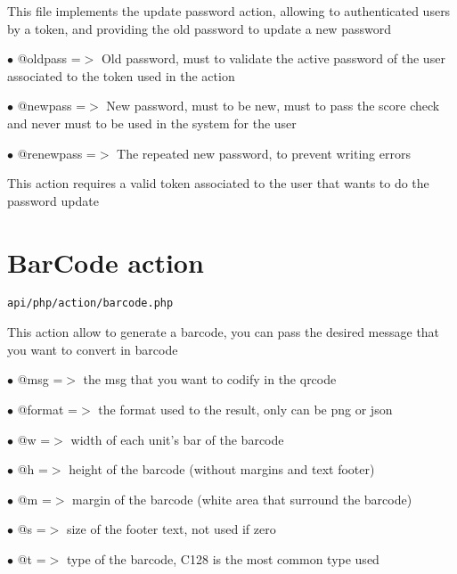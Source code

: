\documentclass[a4paper]{book}
\begin{document}
This file implements the update password action, allowing to authenticated
users by a token, and providing the old password to update a new password

\begin{compactitem}
\item[\color{myblue}$\bullet$] @oldpass   =$>$ Old password, must to validate the active password of the user
              associated to the token used in the action
\item[\color{myblue}$\bullet$] @newpass   =$>$ New password, must to be new, must to pass the score check and
              never must to be used in the system for the user
\item[\color{myblue}$\bullet$] @renewpass =$>$ The repeated new password, to prevent writing errors
\end{compactitem}

This action requires a valid token associated to the user that wants to do
the password update

\hypertarget{toc8}{}
\section{BarCode action}

\begin{lstlisting}
api/php/action/barcode.php
\end{lstlisting}

This action allow to generate a barcode, you can pass the desired
message that you want to convert in barcode

\begin{compactitem}
\item[\color{myblue}$\bullet$] @msg    =$>$ the msg that you want to codify in the qrcode
\item[\color{myblue}$\bullet$] @format =$>$ the format used to the result, only can be png or json
\end{compactitem}

\begin{compactitem}
\item[\color{myblue}$\bullet$] @w =$>$ width of each unit's bar of the barcode
\item[\color{myblue}$\bullet$] @h =$>$ height of the barcode (without margins and text footer)
\item[\color{myblue}$\bullet$] @m =$>$ margin of the barcode (white area that surround the barcode)
\item[\color{myblue}$\bullet$] @s =$>$ size of the footer text, not used if zero
\item[\color{myblue}$\bullet$] @t =$>$ type of the barcode, C128 is the most common type used
\end{compactitem}
\end{document}
